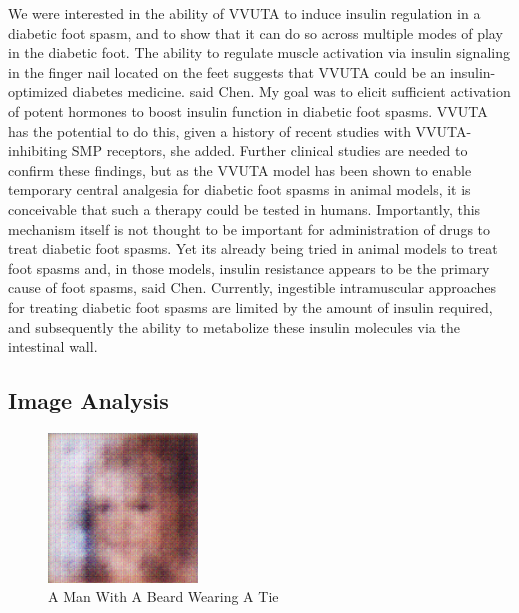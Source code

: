 \documentclass{article}%
\begin{document}
We were interested in the ability of VVUTA to induce insulin regulation in a diabetic foot spasm, and to show that it can do so across multiple modes of play in the diabetic foot. The ability to regulate muscle activation via insulin signaling in the finger nail located on the feet suggests that VVUTA could be an insulin{-}optimized diabetes medicine. said Chen.\newline%
My goal was to elicit sufficient activation of potent hormones to boost insulin function in diabetic foot spasms. VVUTA has the potential to do this, given a history of recent studies with VVUTA{-}inhibiting SMP receptors, she added.\newline%
Further clinical studies are needed to confirm these findings, but as the VVUTA model has been shown to enable temporary central analgesia for diabetic foot spasms in animal models, it is conceivable that such a therapy could be tested in humans.\newline%
Importantly, this mechanism itself is not thought to be important for administration of drugs to treat diabetic foot spasms. Yet its already being tried in animal models to treat foot spasms and, in those models, insulin resistance appears to be the primary cause of foot spasms, said Chen.\newline%
Currently, ingestible intramuscular approaches for treating diabetic foot spasms are limited by the amount of insulin required, and subsequently the ability to metabolize these insulin molecules via the intestinal wall.

%
\subsection{Image Analysis}%
\label{subsec:ImageAnalysis}%


\begin{figure}[h!]%
\centering%
\includegraphics[width=150px]{500_fake_images/samples_5_386.png}%
\caption{A Man With A Beard Wearing A Tie}%
\end{figure}

%
\end{document}
